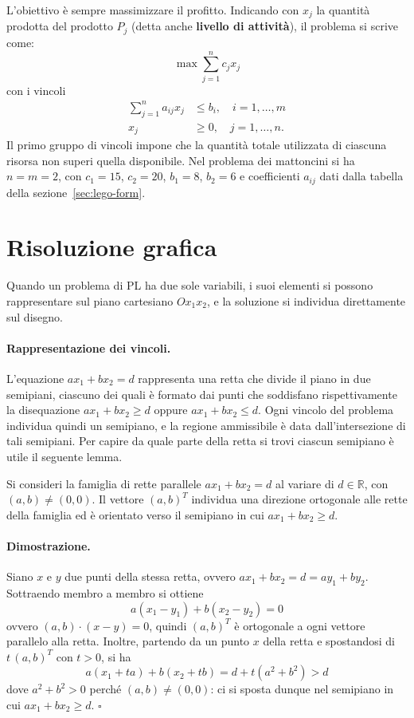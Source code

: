 L'obiettivo è sempre massimizzare il profitto. Indicando con $x_j$ la quantità prodotta del prodotto $P_j$ (detta anche \textbf{livello di attività}), il problema si scrive come:
\begin{equation}\label{eq:produzione}
\max \sum_{j=1}^{n} c_j x_j
\end{equation}
con i vincoli
\[
\begin{aligned}
\sum_{j=1}^{n} a_{ij} x_j &\le b_i, \quad i = 1, \dots, m \\
x_j &\ge 0, \quad j = 1, \dots, n.
\end{aligned}
\]
Il primo gruppo di vincoli impone che la quantità totale utilizzata di ciascuna risorsa non superi quella disponibile. Nel problema dei mattoncini si ha $n = m = 2$, con $c_1 = 15$, $c_2 = 20$, $b_1 = 8$, $b_2 = 6$ e coefficienti $a_{ij}$ dati dalla tabella della sezione~\ref{sec:lego-form}.

\section{Risoluzione grafica}\label{sec:graf}
Quando un problema di PL ha due sole variabili, i suoi elementi si possono rappresentare sul piano cartesiano $Ox_1x_2$, e la soluzione si individua direttamente sul disegno.

\paragraph{Rappresentazione dei vincoli.}
L'equazione $a x_1 + b x_2 = d$ rappresenta una retta che divide il piano in due semipiani, ciascuno dei quali è formato dai punti che soddisfano rispettivamente la disequazione $a x_1 + b x_2 \ge d$ oppure $a x_1 + b x_2 \le d$. Ogni vincolo del problema individua quindi un semipiano, e la regione ammissibile è data dall'intersezione di tali semipiani. Per capire da quale parte della retta si trovi ciascun semipiano è utile il seguente lemma.

\begin{lemma}\label{lem:ortogonale}
Si consideri la famiglia di rette parallele $a x_1 + b x_2 = d$ al variare di $d \in \mathbb{R}$, con $(a, b) \neq (0, 0)$. Il vettore $(a, b)^T$ individua una direzione ortogonale alle rette della famiglia ed è orientato verso il semipiano in cui $a x_1 + b x_2 \ge d$.
\end{lemma}

\paragraph{Dimostrazione.}
Siano $x$ e $y$ due punti della stessa retta, ovvero $a x_1 + b x_2 = d = a y_1 + b y_2$. Sottraendo membro a membro si ottiene
\[
a(x_1 - y_1) + b(x_2 - y_2) = 0
\]
ovvero $(a, b) \cdot (x - y) = 0$, quindi $(a,b)^T$ è ortogonale a ogni vettore parallelo alla retta. Inoltre, partendo da un punto $x$ della retta e spostandosi di $t\,(a, b)^T$ con $t > 0$, si ha
\[
a(x_1 + t a) + b(x_2 + t b) = d + t(a^2 + b^2) > d
\]
dove $a^2 + b^2 > 0$ perché $(a,b) \neq (0,0)$: ci si sposta dunque nel semipiano in cui $a x_1 + b x_2 \ge d$. \hfill $\square$

